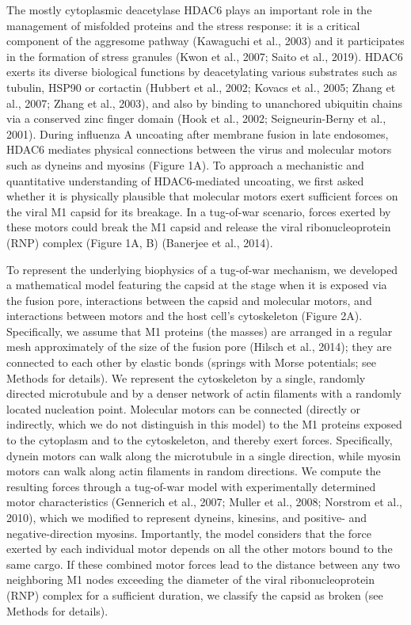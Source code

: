 The mostly cytoplasmic deacetylase HDAC6 plays an important role in the management of misfolded proteins and the stress response: it is a critical component of the aggresome pathway (Kawaguchi et al., 2003) and it participates in the formation of stress granules (Kwon et al., 2007; Saito et al., 2019). HDAC6 exerts its diverse biological functions by deacetylating various substrates such as tubulin, HSP90 or cortactin (Hubbert et al., 2002; Kovacs et al., 2005; Zhang et al., 2007; Zhang et al., 2003), and also by binding to unanchored ubiquitin chains via a conserved zinc finger domain (Hook et al., 2002; Seigneurin-Berny et al., 2001). During influenza A uncoating after membrane fusion in late endosomes, HDAC6 mediates physical connections between the virus and molecular motors such as dyneins and myosins (Figure 1A). To approach a mechanistic and quantitative understanding of HDAC6-mediated uncoating, we first asked whether it is physically plausible that molecular motors exert sufficient forces on the viral M1 capsid for its breakage. In a tug-of-war scenario, forces exerted by these motors could break the M1 capsid and release the viral ribonucleoprotein (RNP) complex (Figure 1A, B) (Banerjee et al., 2014).

To represent the underlying biophysics of a tug-of-war mechanism, we developed a mathematical model featuring the capsid at the stage when it is exposed via the fusion pore, interactions between the capsid and molecular motors, and interactions between motors and the host cell’s cytoskeleton (Figure 2A). Specifically, we assume that M1 proteins (the masses) are arranged in a regular mesh approximately of the size of the fusion pore (Hilsch et al., 2014); they are connected to each other by elastic bonds (springs with Morse potentials; see Methods for details). We represent the cytoskeleton by a single, randomly directed microtubule and by a denser network of actin filaments with a randomly located nucleation point. Molecular motors can be connected (directly or indirectly, which we do not distinguish in this model) to the M1 proteins exposed to the cytoplasm and to the cytoskeleton, and thereby exert forces. Specifically, dynein motors can walk along the microtubule in a single direction, while myosin motors can walk along actin filaments in random directions. We compute the resulting forces through a tug-of-war model with experimentally determined motor characteristics (Gennerich et al., 2007; Muller et al., 2008; Norstrom et al., 2010), which we modified to represent dyneins, kinesins, and positive- and negative-direction myosins. Importantly, the model considers that the force exerted by each individual motor depends on all the other motors bound to the same cargo. If these combined motor forces lead to the distance between any two neighboring M1 nodes exceeding the diameter of the viral ribonucleoprotein (RNP) complex for a sufficient duration, we classify the capsid as broken (see Methods for details).

